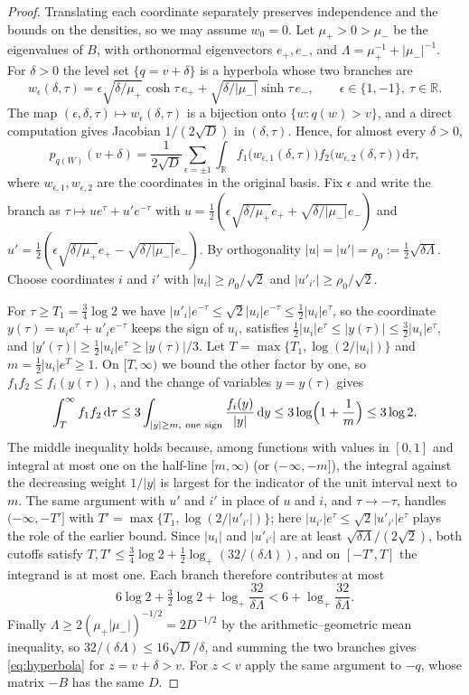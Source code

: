 \documentclass[11pt]{amsart}
\numberwithin{equation}{section}
\theoremstyle{definition}
\theoremstyle{remark}
\newcommand{\R}{\mathbb R}
\newcommand{\1}{\mathbf 1}
\newcommand{\dd}{\,\mathrm d}
\newcommand{\logp}{\log_+}
\newcommand{\abs}[1]{\lvert #1\rvert}
\begin{document}
\begin{proof}
Translating each coordinate separately preserves independence and the bounds on the densities, so we may assume $w_0=0$. Let $\mu_+>0>\mu_-$ be the eigenvalues of $B$, with orthonormal eigenvectors $e_+,e_-$, and $\Lambda=\mu_+^{-1}+\abs{\mu_-}^{-1}$. For $\delta>0$ the level set $\{q=v+\delta\}$ is a hyperbola whose two branches are
\[
w_\epsilon(\delta,\tau)=\epsilon\sqrt{\delta/\mu_+}\cosh\tau\,e_++\sqrt{\delta/\abs{\mu_-}}\sinh\tau\,e_-,\qquad\epsilon\in\{1,-1\},\ \tau\in\R .
\]
The map $(\epsilon,\delta,\tau)\mapsto w_\epsilon(\delta,\tau)$ is a bijection onto $\{w:q(w)>v\}$, and a direct computation gives Jacobian $1/(2\sqrt D)$ in $(\delta,\tau)$. Hence, for almost every $\delta>0$,
\[
p_{q(W)}(v+\delta)=\frac1{2\sqrt D}\sum_{\epsilon=\pm1}\int_\R f_1\bigl(w_{\epsilon,1}(\delta,\tau)\bigr)f_2\bigl(w_{\epsilon,2}(\delta,\tau)\bigr)\dd\tau,
\]
where $w_{\epsilon,1},w_{\epsilon,2}$ are the coordinates in the original basis. Fix $\epsilon$ and write the branch as $\tau\mapsto ue^\tau+u'e^{-\tau}$ with $u=\frac12(\epsilon\sqrt{\delta/\mu_+}e_++\sqrt{\delta/\abs{\mu_-}}e_-)$ and $u'=\frac12(\epsilon\sqrt{\delta/\mu_+}e_+-\sqrt{\delta/\abs{\mu_-}}e_-)$. By orthogonality $\abs u=\abs{u'}=\rho_0:=\frac12\sqrt{\delta\Lambda}$. Choose coordinates $i$ and $i'$ with $\abs{u_i}\ge\rho_0/\sqrt2$ and $\abs{u'_{i'}}\ge\rho_0/\sqrt2$.

For $\tau\ge T_1=\frac34\log2$ we have $\abs{u'_i}e^{-\tau}\le\sqrt2\abs{u_i}e^{-\tau}\le\frac12\abs{u_i}e^\tau$, so the coordinate $y(\tau)=u_ie^\tau+u'_ie^{-\tau}$ keeps the sign of $u_i$, satisfies $\frac12\abs{u_i}e^\tau\le\abs{y(\tau)}\le\frac32\abs{u_i}e^\tau$, and $\abs{y'(\tau)}\ge\frac12\abs{u_i}e^\tau\ge\abs{y(\tau)}/3$. Let $T=\max\{T_1,\log(2/\abs{u_i})\}$ and $m=\frac12\abs{u_i}e^T\ge1$. On $[T,\infty)$ we bound the other factor by one, so $f_1f_2\le f_i(y(\tau))$, and the change of variables $y=y(\tau)$ gives
\[
\int_T^\infty f_1f_2\dd\tau\le3\int_{\abs y\ge m,\ \mathrm{one\ sign}}\frac{f_i(y)}{\abs y}\dd y\le3\log\Bigl(1+\frac1m\Bigr)\le3\log2 .
\]
The middle inequality holds because, among functions with values in $[0,1]$ and integral at most one on the half-line $[m,\infty)$ (or $(-\infty,-m]$), the integral against the decreasing weight $1/\abs y$ is largest for the indicator of the unit interval next to $m$. The same argument with $u'$ and $i'$ in place of $u$ and $i$, and $\tau\to-\tau$, handles $(-\infty,-T']$ with $T'=\max\{T_1,\log(2/\abs{u'_{i'}})\}$; here $\abs{u_{i'}}e^{\tau}\le\sqrt2\abs{u'_{i'}}e^{\tau}$ plays the role of the earlier bound. Since $\abs{u_i}$ and $\abs{u'_{i'}}$ are at least $\sqrt{\delta\Lambda}/(2\sqrt2)$, both cutoffs satisfy $T,T'\le\frac34\log2+\frac12\logp(32/(\delta\Lambda))$, and on $[-T',T]$ the integrand is at most one. Each branch therefore contributes at most
\[
6\log2+\tfrac32\log2+\logp\frac{32}{\delta\Lambda}<6+\logp\frac{32}{\delta\Lambda}.
\]
Finally $\Lambda\ge2(\mu_+\abs{\mu_-})^{-1/2}=2D^{-1/2}$ by the arithmetic--geometric mean inequality, so $32/(\delta\Lambda)\le16\sqrt D/\delta$, and summing the two branches gives \eqref{eq:hyperbola} for $z=v+\delta>v$. For $z<v$ apply the same argument to $-q$, whose matrix $-B$ has the same $D$.
\end{proof}
\end{document}
